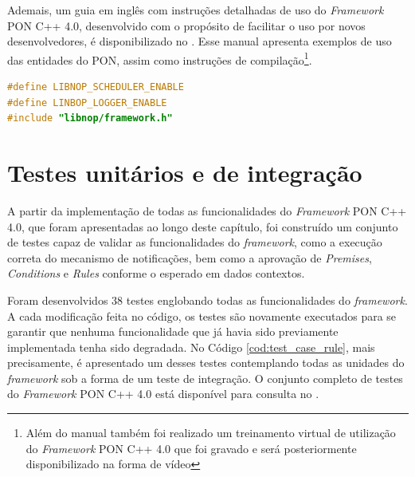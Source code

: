 Ademais, um guia em inglês com instruções detalhadas de uso do
\textit{Framework} PON C++ 4.0, desenvolvido com o propósito de facilitar o uso
por novos desenvolvedores, é disponibilizado no . Esse manual
apresenta exemplos de uso das entidades do PON, assim como instruções de
compilação\footnote{Além do manual também foi realizado um treinamento virtual
de utilização do \textit{Framework} PON C++ 4.0 que foi gravado e será
posteriormente disponibilizado na forma de vídeo}.

\begin{lstlisting}[language=C++, float=htb,
    caption = {Uso de defines do \textit{Framework} PON C++ 4.0},
    source = {Autoria própria},
    label = {cod:defines}]
#define LIBNOP_SCHEDULER_ENABLE
#define LINBOP_LOGGER_ENABLE
#include "libnop/framework.h"
\end{lstlisting}

\section{Testes unitários e de integração}\label{sec:unit_test}

A partir da implementação de todas as funcionalidades do \textit{Framework} PON
C++ 4.0, que foram apresentadas ao longo deste capítulo, foi construído um
conjunto de testes capaz de validar as funcionalidades do \textit{framework},
como a execução correta do mecanismo de notificações, bem como a aprovação de
\textit{Premises}, \textit{Conditions} e \textit{Rules} conforme o esperado em
dados contextos.

Foram desenvolvidos 38 testes englobando todas as funcionalidades do
\textit{framework}. A cada modificação feita no código, os testes são novamente
executados para se garantir que nenhuma funcionalidade que já havia sido
previamente implementada tenha sido degradada. No Código
\ref{cod:test_case_rule}, mais precisamente, é apresentado um desses testes
contemplando todas as unidades do \textit{framework} sob a forma de um teste de
integração. O conjunto completo de testes do \textit{Framework} PON C++ 4.0 está
disponível para consulta no .

